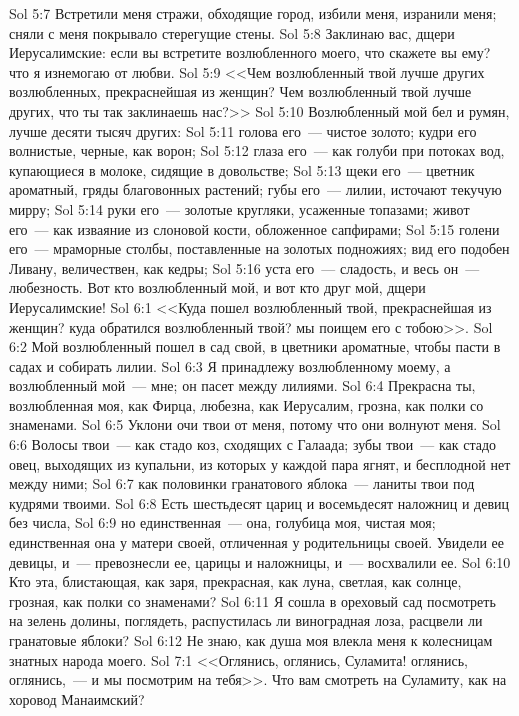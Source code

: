 \vs Sol 5:7 Встретили меня стражи, обходящие город, избили меня, изранили меня; сняли с меня покрывало стерегущие стены.
\vs Sol 5:8 Заклинаю вас, дщери Иерусалимские: если вы встретите возлюбленного моего, что скажете вы ему? что я изнемогаю от любви.
\vs Sol 5:9 <<Чем возлюбленный твой лучше других возлюбленных, прекраснейшая из женщин? Чем возлюбленный твой лучше других, что ты так заклинаешь нас?>>
\vs Sol 5:10 Возлюбленный мой бел и румян, лучше десяти тысяч других:
\vs Sol 5:11 голова его~--- чистое золото; кудри его волнистые, черные, как ворон;
\vs Sol 5:12 глаза его~--- как голуби при потоках вод, купающиеся в молоке, сидящие в довольстве;
\vs Sol 5:13 щеки его~--- цветник ароматный, гряды благовонных растений; губы его~--- лилии, источают текучую мирру;
\vs Sol 5:14 руки его~--- золотые кругляки, усаженные топазами; живот его~--- как изваяние из слоновой кости, обложенное сапфирами;
\vs Sol 5:15 голени его~--- мраморные столбы, поставленные на золотых подножиях; вид его подобен Ливану, величествен, как кедры;
\vs Sol 5:16 уста его~--- сладость, и весь он~--- любезность. Вот кто возлюбленный мой, и вот кто друг мой, дщери Иерусалимские!
\vs Sol 6:1 <<Куда пошел возлюбленный твой, прекраснейшая из женщин? куда обратился возлюбленный твой? мы поищем его с тобою>>.
\vs Sol 6:2 Мой возлюбленный пошел в сад свой, в цветники ароматные, чтобы пасти в садах и собирать лилии.
\vs Sol 6:3 Я принадлежу возлюбленному моему, а возлюбленный мой~--- мне; он пасет между лилиями.
\rsbpar\vs Sol 6:4 Прекрасна ты, возлюбленная моя, как Фирца, любезна, как Иерусалим, грозна, как полки со знаменами.
\vs Sol 6:5 Уклони очи твои от меня, потому что они волнуют меня.
\vs Sol 6:6 Волосы твои~--- как стадо коз, сходящих с Галаада; зубы твои~--- как стадо овец, выходящих из купальни, из которых у каждой пара ягнят, и бесплодной нет между ними;
\vs Sol 6:7 как половинки гранатового яблока~--- ланиты твои под кудрями твоими.
\vs Sol 6:8 Есть шестьдесят цариц и восемьдесят наложниц и девиц без числа,
\vs Sol 6:9 но единственная~--- она, голубица моя, чистая моя; единственная она у матери своей, отличенная у родительницы своей. Увидели ее девицы, и~--- превознесли ее, царицы и наложницы, и~--- восхвалили ее.
\vs Sol 6:10 Кто эта, блистающая, как заря, прекрасная, как луна, светлая, как солнце, грозная, как полки со знаменами?
\vs Sol 6:11 Я сошла в ореховый сад посмотреть на зелень долины, поглядеть, распустилась ли виноградная лоза, расцвели ли гранатовые яблоки?
\vs Sol 6:12 Не знаю, как душа моя влекла меня к колесницам знатных народа моего.
\vs Sol 7:1 <<Оглянись, оглянись, Суламита! оглянись, оглянись,~--- и мы посмотрим на тебя>>. Что вам смотреть на Суламиту, как на хоровод Манаимский?
